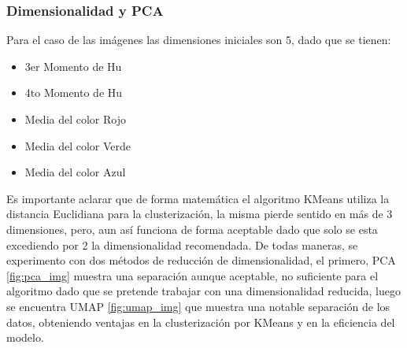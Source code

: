 \documentclass[12pt,a4paper]{article}
\begin{document}
\subsubsection*{Dimensionalidad y PCA}
    Para el caso de las imágenes las dimensiones iniciales son 5, dado que se tienen:
\begin{itemize}
    \item 3er Momento de Hu
    \item 4to Momento de Hu
    \item Media del color Rojo
    \item Media del color Verde
    \item Media del color Azul
\end{itemize}
    Es importante aclarar que de forma matemática el algoritmo KMeans utiliza la distancia Euclidiana para la clusterización, la misma pierde sentido en más de 3 dimensiones, pero, aun así funciona de forma aceptable dado que solo se esta excediendo por 2 la dimensionalidad recomendada. De todas maneras, se experimento con dos métodos de reducción de dimensionalidad, el primero, PCA \ref{fig:pca_img} muestra una separación aunque aceptable, no suficiente para el algoritmo dado que se pretende trabajar con una dimensionalidad reducida, luego se encuentra UMAP \ref{fig:umap_img} que muestra una notable separación de los datos, obteniendo ventajas en la clusterización por KMeans y en la eficiencia del modelo.
    
\end{document}
